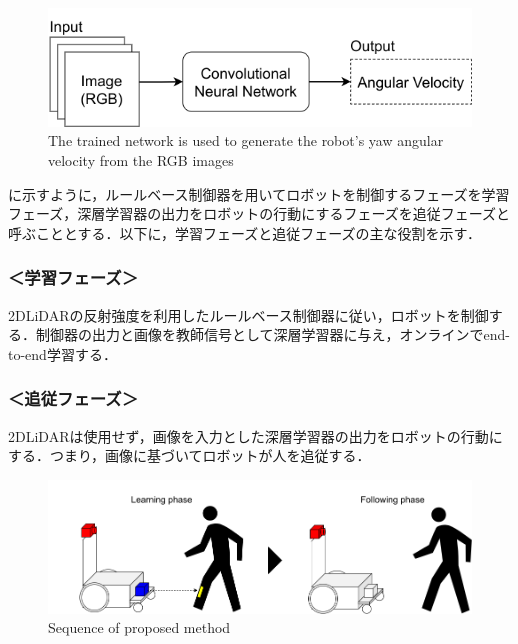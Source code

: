   \begin{figure}[h]
    \centering
    \includegraphics[keepaspectratio, scale=0.50] {images/RobotGuidance_simple_system.png}
    \captionsetup{justification=raggedright} %
    \caption{The trained network is used to generate the robot's yaw angular velocity from the RGB images}
    \label{Fig:RobotGuidance_simple_system}
  \end{figure}

  に示すように，ルールベース制御器を用いてロボットを制御するフェーズを学習フェーズ，深層学習器の出力をロボットの行動にするフェーズを追従フェーズと呼ぶこととする．以下に，学習フェーズと追従フェーズの主な役割を示す．

  \subsubsection*{＜学習フェーズ＞}
  2DLiDARの反射強度を利用したルールベース制御器に従い，ロボットを制御する．制御器の出力と画像を教師信号として深層学習器に与え，オンラインでend-to-end学習する．
  
  \subsubsection*{＜追従フェーズ＞}
  2DLiDARは使用せず，画像を入力とした深層学習器の出力をロボットの行動にする．つまり，画像に基づいてロボットが人を追従する．

  \begin{figure}[h]
    \centering
    \includegraphics[keepaspectratio, scale=0.35] {images/RobotGuidance_all_system.png}
    \captionsetup{justification=raggedright} %
    \caption{Sequence of proposed method}
    \label{Fig:RobotGuidance_all_system}
  \end{figure}

\newpage
